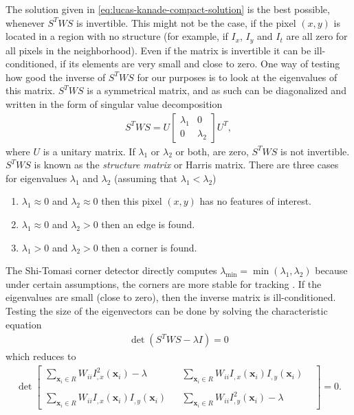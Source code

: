 \documentclass[letterpaper,11pt]{article}
\begin{document}
The solution given in \eqref{eq:lucas-kanade-compact-solution} is the best possible, whenever $S^T W S$ is invertible.
This might not be the case, if the pixel $(x, y)$ is located in a region with no structure (for example, if $I_x$, $I_y$ and $I_t$ are all zero for all pixels in the neighborhood). Even if the matrix is invertible it can be ill-conditioned, if its elements are very small and close to zero. One way of testing how good the inverse of $S^T W S$ for our purposes is to
look at the eigenvalues of this matrix. $S^T W S$ is a symmetrical matrix, and as
such can be diagonalized and written in the form of singular value decomposition
\begin{align}
S^T W S = U \begin{bmatrix}  
\lambda_1 & 0 \\
0 & \lambda_2
\end{bmatrix} U^T,
\end{align}
where $U$ is a unitary matrix. If $\lambda_1$ or $\lambda_2$ or both,
are zero, $S^T W S$ is not invertible.  $S^T W S$ is known as the \emph{structure matrix} or {Harris matrix}.  
There are three cases for eigenvalues $\lambda_1$ and $\lambda_2$ (assuming that $\lambda_1 < \lambda_2$)
\begin{enumerate}
\item $\lambda_1 \approx 0$ and $\lambda_2 \approx 0$  then this pixel $(x,y)$ has no features of interest.
\item $\lambda_1 \approx 0$ and $\lambda_2 > 0$  then an edge is found.
\item $\lambda_1 > 0$ and $\lambda_2 > 0$ then a corner is found.
\end{enumerate}
The Shi-Tomasi corner detector directly computes  $\lambda_{\min} = \min(\lambda_1, \lambda_2)$ because under certain assumptions, the corners are more stable for tracking \citep{Shi-Tomasi:1994}. If the eigenvalues are small (close to zero), then the inverse matrix is
ill-conditioned. Testing the size of the eigenvectors can be done by solving the characteristic
equation
\begin{align}
\det (S^T W S - \lambda I) = 0
\end{align}
which reduces to
\begin{align}
\det \begin{bmatrix}
\sum_{\mathbf{x}_i \in R} W_{ii} I_{,x}^2(\mathbf{x}_i) - \lambda & &  \sum_{\mathbf{x}_i \in R} W_{ii} I_{,x}(\mathbf{x}_i)I_{,y}(\mathbf{x}_i)\\ 
& & & \\
\sum_{\mathbf{x}_i \in R} W_{ii} I_{,x}(\mathbf{x}_i)I_{,y}(\mathbf{x}_i) & & \sum_{\mathbf{x}_i \in R} W_{ii} I_{,y}^2(\mathbf{x}_i) - \lambda
\end{bmatrix} = 0.
\end{align}
\end{document}
